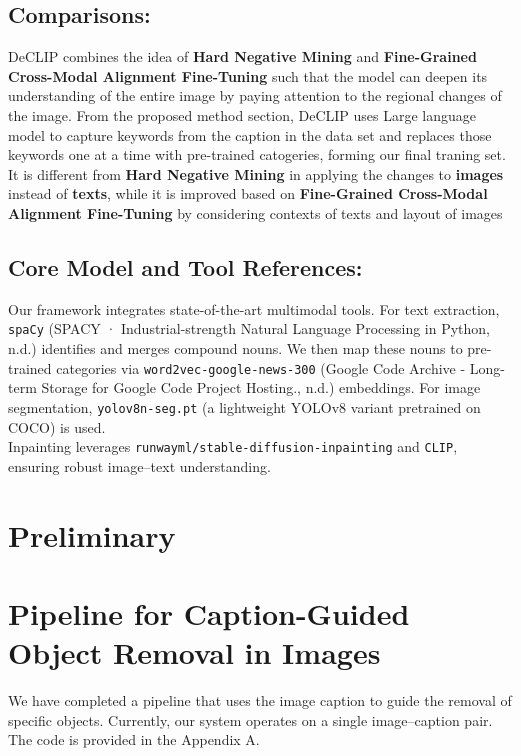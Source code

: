 \documentclass[11pt,letterpaper]{article}
\begin{document}
\subsection{Comparisons:}
DeCLIP combines the idea of \textbf{Hard Negative Mining} and \textbf{Fine-Grained Cross-Modal Alignment Fine-Tuning} such that the model can deepen its understanding of the entire image by paying attention to the regional changes of the image. From the proposed method section, DeCLIP uses Large language model to capture keywords from the caption in the data set and replaces those keywords one at a time with pre-trained catogeries, forming our final traning set. It is different from \textbf{Hard Negative Mining} in applying the changes to \textbf{images} instead of \textbf{texts}, while it is improved based on \textbf{Fine-Grained Cross-Modal Alignment Fine-Tuning} by considering contexts of texts and layout of images
\subsection{Core Model and Tool References:}
Our framework integrates state-of-the-art multimodal tools. For text extraction, \texttt{spaCy} \cite{spacy2025}(SPACY · Industrial-strength Natural Language Processing in Python, n.d.) identifies and merges compound nouns. We then map these nouns to pre-trained categories via \texttt{word2vec-google-news-300} \cite{word2vec2025} (Google Code Archive - Long-term Storage for Google Code Project Hosting., n.d.) embeddings. For image segmentation, \texttt{yolov8n-seg.pt} (a lightweight YOLOv8 variant pretrained on COCO) is used.\\ Inpainting leverages \texttt{runwayml/stable-diffusion-inpainting} and \texttt{CLIP}, ensuring robust image–text understanding.





\section{Preliminary}


\section*{Pipeline for Caption-Guided Object Removal in Images}

We have completed a pipeline that uses the image caption to guide the removal of specific objects. Currently, our system operates on a single image--caption pair. The code is provided in the Appendix A.
\end{document}
